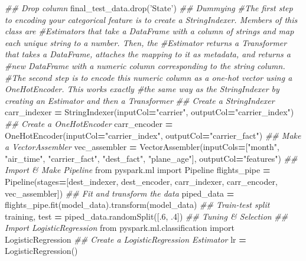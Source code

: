 \documentclass[]{book}
\newenvironment{Shaded}{\begin{snugshade}}{\end{snugshade}}
\newcommand{\DecValTok}[1]{\textcolor[rgb]{0.00,0.00,0.81}{#1}}
\newcommand{\StringTok}[1]{\textcolor[rgb]{0.31,0.60,0.02}{#1}}
\newcommand{\ImportTok}[1]{#1}
\newcommand{\CommentTok}[1]{\textcolor[rgb]{0.56,0.35,0.01}{\textit{#1}}}
\newcommand{\OperatorTok}[1]{\textcolor[rgb]{0.81,0.36,0.00}{\textbf{#1}}}
\newcommand{\NormalTok}[1]{#1}
\theoremstyle{definition}
\theoremstyle{definition}
\theoremstyle{definition}
\theoremstyle{remark}
\begin{document}
\begin{Shaded}
\begin{Highlighting}[]
\CommentTok{## Drop column}
\NormalTok{final_test_data.drop(}\StringTok{'State'}\NormalTok{)}
\CommentTok{## Dummying}
\CommentTok{#The first step to encoding your categorical feature is to create a StringIndexer. Members of this class are #Estimators that take a DataFrame with a column of strings and map each unique string to a number. Then, the #Estimator returns a Transformer that takes a DataFrame, attaches the mapping to it as metadata, and returns a #new DataFrame with a numeric column corresponding to the string column.}
\CommentTok{#The second step is to encode this numeric column as a one-hot vector using a OneHotEncoder. This works exactly #the same way as the StringIndexer by creating an Estimator and then a Transformer}
\CommentTok{## Create a StringIndexer}
\NormalTok{carr_indexer }\OperatorTok{=}\NormalTok{ StringIndexer(inputCol}\OperatorTok{=}\StringTok{"carrier"}\NormalTok{, outputCol}\OperatorTok{=}\StringTok{"carrier_index"}\NormalTok{)}
\CommentTok{## Create a OneHotEncoder}
\NormalTok{carr_encoder }\OperatorTok{=}\NormalTok{ OneHotEncoder(inputCol}\OperatorTok{=}\StringTok{"carrier_index"}\NormalTok{, outputCol}\OperatorTok{=}\StringTok{"carrier_fact"}\NormalTok{)}
\CommentTok{## Make a VectorAssembler}
\NormalTok{vec_assembler }\OperatorTok{=}\NormalTok{ VectorAssembler(inputCols}\OperatorTok{=}\NormalTok{[}\StringTok{"month"}\NormalTok{, }\StringTok{"air_time"}\NormalTok{, }\StringTok{"carrier_fact"}\NormalTok{, }\StringTok{"dest_fact"}\NormalTok{, }\StringTok{"plane_age"}\NormalTok{], outputCol}\OperatorTok{=}\StringTok{"features"}\NormalTok{)}
\CommentTok{## Import & Make Pipeline}
\ImportTok{from}\NormalTok{ pyspark.ml }\ImportTok{import}\NormalTok{ Pipeline}
\NormalTok{flights_pipe }\OperatorTok{=}\NormalTok{ Pipeline(stages}\OperatorTok{=}\NormalTok{[dest_indexer, dest_encoder, carr_indexer, carr_encoder, vec_assembler])}
\CommentTok{## Fit and transform the data}
\NormalTok{piped_data }\OperatorTok{=}\NormalTok{ flights_pipe.fit(model_data).transform(model_data)}
\CommentTok{## Train-test split}
\NormalTok{training, test }\OperatorTok{=}\NormalTok{ piped_data.randomSplit([.}\DecValTok{6}\NormalTok{, .}\DecValTok{4}\NormalTok{])}
\CommentTok{## Tuning & Selection}
\CommentTok{## Import LogisticRegression}
\ImportTok{from}\NormalTok{ pyspark.ml.classification }\ImportTok{import}\NormalTok{ LogisticRegression}
\CommentTok{## Create a LogisticRegression Estimator}
\NormalTok{lr }\OperatorTok{=}\NormalTok{ LogisticRegression()}

\end{Highlighting}
\end{Shaded}
\end{document}
